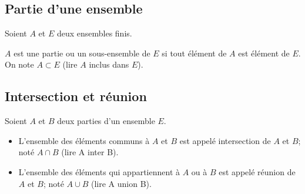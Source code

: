 \subsection*{Partie d'une ensemble}
\begin{definition}
Soient $A $ et $ E$ deux ensembles finis.

 $ A $ est une partie ou  un sous-ensemble de $ E $ si tout élément de $ A $ est élément de $ E. $  On note $ A \subset E $ (lire $ A$ inclus dans $E $).

\end{definition}
\subsection*{Intersection et réunion}
Soient $A $ et $ B $ deux parties d'un ensemble   $E. $
\begin{definition}
\begin{itemize}
\item[\textbullet] L'ensemble des éléments communs à  $A $ et $ B $ est appelé intersection de $A $ et $ B$; noté $ A\cap B $  (lire A inter B).

\item[\textbullet] L'ensemble des éléments qui appartiennent  à  $A $ ou à $ B $ est appelé réunion de $A $ et $ B$; noté $ A\cup  B $  (lire A union B).

\end{itemize}
\end{definition}
